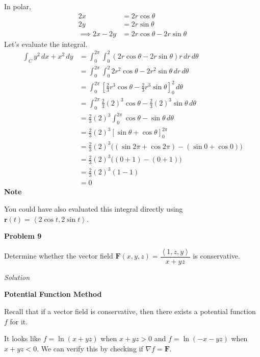\documentclass{article}
\newcommand{\lrp}[1]{\left( #1 \right)}
\newcommand{\lra}[1]{\left\langle #1 \right\rangle}
\newcommand{\lrb}[1]{\left[ #1 \right]}
\renewcommand{\r}[0]{\mathbf{r}}
\newcommand{\F}[0]{\mathbf{F}}
\newcommand{\Solution}{\textit{Solution}}
\begin{document}
In polar,
\begin{align*}
    2x&=2r\cos\theta\tag{$x=r\cos \theta$}\\
    2y&=2r\sin\theta\tag{$y=r\sin\theta$}\\
    \implies 2x - 2y &= 2r\cos\theta - 2r\sin\theta
\end{align*}
Let's evaluate the integral.
\begin{align*}
    \int_C y^2\,dx+x^2\,dy&=\int_0^{2\pi}\int_0^2\lrp{2r\cos\theta-2r\sin\theta}r\,dr\,d\theta\\
    &=\int_0^{2\pi}\int_0^2 2r^2\cos\theta-2r^2\sin\theta\,dr\,d\theta\\
    &=\int_0^{2\pi}\lrb{\frac{2}{3}r^3\cos\theta-\frac{2}{3}r^3\sin\theta}_0^2\,d\theta\\
    &=\int_0^{2\pi}\frac{2}{3}(2)^3\cos\theta-\frac{2}{3}(2)^3\sin\theta\,d\theta\\
    &=\frac{2}{3}(2)^3\int_0^{2\pi}\cos\theta-\sin\theta\,d\theta\tag{we can take constants out}\\
    &=\frac{2}{3}(2)^3\lrb{\sin \theta+\cos\theta}_0^{2\pi}\\
    &=\frac{2}{3}(2)^3\Big(\lrp{\sin 2\pi+\cos 2\pi}-\lrp{\sin 0+\cos 0}\Big)\\
    &=\frac{2}{3}(2)^3 \Big(\lrp{0+1}-\lrp{0+1}\Big)\\
    &=\frac{2}{3}(2)^3\lrp{1-1}\\
    &=\boxed{0}
\end{align*}
\textbf{Note}

You could have also evaluated this integral directly using $\r(t)=\lra{2\cos t, 2\sin t}$.

{}\textbf{Problem 9}

Determine whether the vector field $\F(x,y,z)=\dfrac{\lra{1,z,y}}{x+yz}$ is conservative.

\Solution

{}\textbf{Potential Function Method}

Recall that if a vector field is conservative, then there exists a potential function $f$ for it.

It looks like $\displaystyle f=\ln(x+yz)$ when $x+yz>0$ and $\displaystyle f=\ln(-x-yz)$ when $x+yz<0$. We can verify this by checking if $\nabla f =\F$.
\end{document}
